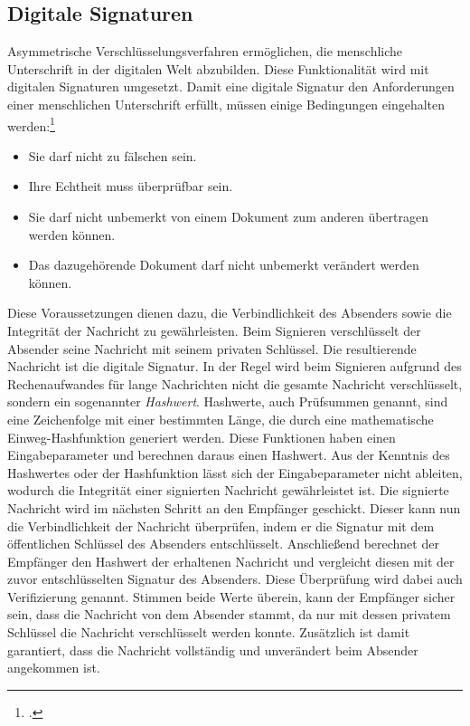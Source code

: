 \documentclass  [paper=a4,
				fontsize=12pt,
				listof=totoc,
				bibliography=totoc
				]{scrreprt}
\begin{document}
		\subsection{Digitale Signaturen}\label{chap:Signatur}	
				Asymmetrische Verschlüsselungsverfahren ermöglichen, die menschliche Unterschrift in der digitalen Welt abzubilden. Diese Funktionalität wird mit digitalen Signaturen umgesetzt. Damit eine digitale Signatur den Anforderungen einer menschlichen Unterschrift erfüllt, müssen einige Bedingungen eingehalten werden:\footcite[Vgl.][S. 202]{Schmeh2013}
				\begin{itemize}
					\item Sie darf nicht zu fälschen sein.
					\item Ihre Echtheit muss überprüfbar sein.
					\item Sie darf nicht unbemerkt von einem Dokument zum anderen übertragen werden können.
					\item Das dazugehörende Dokument darf nicht unbemerkt verändert werden können.
				\end{itemize}
				Diese Voraussetzungen dienen dazu, die Verbindlichkeit des Absenders sowie die Integrität der Nachricht zu gewährleisten. Beim Signieren verschlüsselt der Absender seine Nachricht mit seinem privaten Schlüssel. Die resultierende Nachricht ist die digitale Signatur. In der Regel wird	beim Signieren aufgrund des Rechenaufwandes für lange Nachrichten nicht die gesamte Nachricht verschlüsselt, sondern ein sogenannter \textit{Hashwert}. Hashwerte, auch Prüfsummen genannt, sind eine Zeichenfolge mit einer bestimmten Länge, die durch eine mathematische Einweg-Hashfunktion generiert werden. Diese Funktionen haben einen Eingabeparameter und berechnen daraus einen Hashwert. Aus der Kenntnis des Hashwertes oder der Hashfunktion lässt sich der Eingabeparameter nicht ableiten, wodurch die Integrität einer signierten Nachricht gewährleistet ist.
				Die signierte Nachricht wird im nächsten Schritt an den Empfänger geschickt. Dieser kann nun die Verbindlichkeit der Nachricht überprüfen, indem er die Signatur mit dem öffentlichen Schlüssel des Absenders entschlüsselt. Anschließend berechnet der Empfänger den Hashwert der erhaltenen Nachricht und vergleicht diesen mit der zuvor entschlüsselten Signatur des Absenders. Diese Überprüfung wird dabei auch Verifizierung genannt. Stimmen beide Werte überein, kann der Empfänger sicher sein, dass die Nachricht von dem Absender stammt, da nur mit dessen privatem Schlüssel die Nachricht verschlüsselt werden konnte. Zusätzlich ist damit garantiert, dass die Nachricht vollständig und unverändert beim Absender angekommen ist.
				
\end{document}
